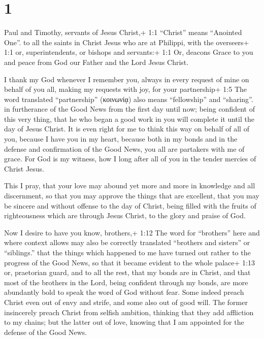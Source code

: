 \hypertarget{section}{%
\section{1}\label{section}}

 Paul and Timothy, servants of Jesus Christ,+ 1:1 ``Christ''
means ``Anointed One''. to all the saints in Christ Jesus who are at
Philippi, with the overseers+ 1:1 or, superintendents, or bishops and
servants:+ 1:1 Or, deacons  Grace to you and peace from God
our Father and the Lord Jesus Christ.

 I thank my God whenever I remember you,  always
in every request of mine on behalf of you all, making my requests with
joy,  for your partnership+ 1:5 The word translated
``partnership'' (κοινωνίᾳ) also means ``fellowship'' and ``sharing''. in
furtherance of the Good News from the first day until now; 
being confident of this very thing, that he who began a good work in you
will complete it until the day of Jesus Christ.  It is even
right for me to think this way on behalf of all of you, because I have
you in my heart, because both in my bonds and in the defense and
confirmation of the Good News, you all are partakers with me of grace.
 For God is my witness, how I long after all of you in the
tender mercies of Christ Jesus.

 This I pray, that your love may abound yet more and more in
knowledge and all discernment,  so that you may approve the
things that are excellent, that you may be sincere and without offense
to the day of Christ,  being filled with the fruits of
righteousness which are through Jesus Christ, to the glory and praise of
God.

 Now I desire to have you know, brothers,+ 1:12 The word
for ``brothers'' here and where context allows may also be correctly
translated ``brothers and sisters'' or ``siblings.'' that the things
which happened to me have turned out rather to the progress of the Good
News,  so that it became evident to the whole palace+ 1:13
or, praetorian guard, and to all the rest, that my bonds are in Christ,
 and that most of the brothers in the Lord, being confident
through my bonds, are more abundantly bold to speak the word of God
without fear.  Some indeed preach Christ even out of envy
and strife, and some also out of good will.  The former
insincerely preach Christ from selfish ambition, thinking that they add
affliction to my chains;  but the latter out of love,
knowing that I am appointed for the defense of the Good News.

